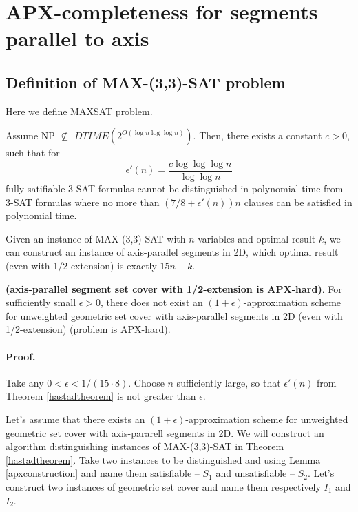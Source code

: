 \section{APX-completeness for segments parallel to axis}
\label{section:segment_apx}

\subsection{Definition of  MAX-(3,3)-SAT problem}
Here we define MAXSAT problem.

\begin{tw}{
	\label{hastadtheorem}
	\textbf{\cite{hastad}}
	Assume NP $\not\subseteq$ $DTIME(2^{O(\log n \log \log n)})$.
	Then, there exists a constant $c > 0$, such that for
	$$\epsilon'(n) = \frac{c \log \log \log n}{\log \log n}$$ 
	fully satifiable 3-SAT formulas cannot be distinguished 
	in polynomial time from
	3-SAT formulas where no more than $(7/8+\epsilon'(n))n$ clauses
	can be satisfied in polynomial time.
}\end{tw}

\begin{lemma}{
	\label{apxconstruction}
	Given an instance of  MAX-(3,3)-SAT 
	with $n$ variables and optimal result $k$,
	we can construct an instance of axis-parallel segments in 2D,
	which optimal result (even with 1/2-extension) is exactly $15n - k$.
}\end{lemma}

\begin{tw}{
	\textbf{(axis-parallel segment set cover with 1/2-extension is APX-hard)}.	
	For sufficiently small $\epsilon > 0$,
	there does not exist an $(1+\epsilon)$-approximation scheme
	for unweighted geometric set cover
	with axis-parallel segments in 2D (even with 1/2-extension)
	(problem is APX-hard).
}\end{tw}

\paragraph{Proof.}
Take any $0 < \epsilon < 1/(15 \cdot 8)$.
Choose $n$ sufficiently large, so that $\epsilon'(n)$ from
Theorem \ref{hastadtheorem}
is not greater than $\epsilon$.

Let's assume that there exists an $(1+\epsilon)$-approximation scheme
for unweighted geometric set cover with axis-pararell segments in 2D.
We will construct an algorithm distinguishing instances of
MAX-(3,3)-SAT
in Theorem \ref{hastadtheorem}.
Take two instances to be distinguished and using
Lemma \ref{apxconstruction}
and name them satisfiable -- $S_1$ and unsatisfiable -- $S_2$.
Let's construct two instances of geometric set cover
and name them respectively $I_1$ and $I_2$.

